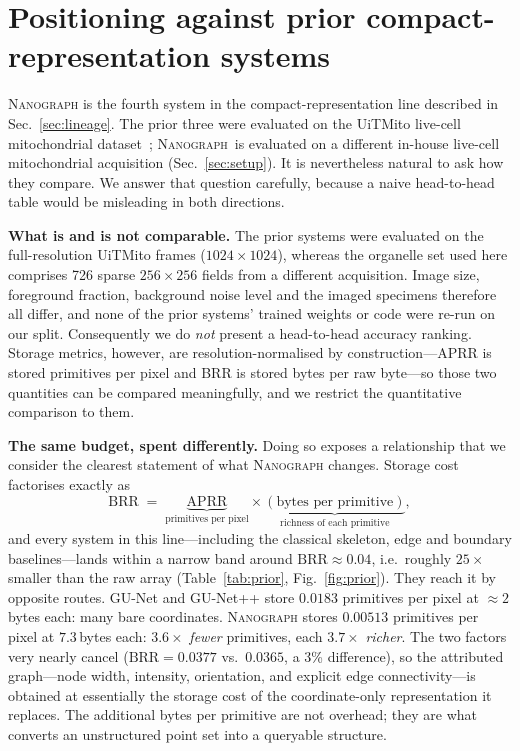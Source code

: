 \documentclass[10pt,a4paper]{article}
\newcommand{\method}{\textnormal{\textsc{Nanograph}}\xspace}
\begin{document}
\section{Positioning against prior compact-representation systems}
\label{sec:prior-comparison}
\method is the fourth system in the compact-representation line described in
Sec.~\ref{sec:lineage}. The prior three were evaluated on the UiTMito
live-cell mitochondrial dataset~\cite{sekh2021}; \method\ is evaluated on a
different in-house live-cell mitochondrial acquisition
(Sec.~\ref{sec:setup}). It is nevertheless
natural to ask how they compare. We answer that question carefully, because a
naive head-to-head table would be misleading in both directions.

\noindent\textbf{What is and is not comparable.} The prior systems were
evaluated on the full-resolution UiTMito frames ($1024\times1024$), whereas
the organelle set used here comprises 726 sparse $256\times256$ fields from
a different acquisition. Image size, foreground fraction, background
noise level and the imaged specimens therefore all differ, and none of the
prior systems' trained
weights or code were re-run on our split. Consequently we do \emph{not}
present a head-to-head accuracy ranking. Storage metrics, however, are
resolution-normalised by construction---APRR is stored primitives per pixel
and BRR is stored bytes per raw byte---so those two quantities can be
compared meaningfully, and we restrict the quantitative comparison to them.

\noindent\textbf{The same budget, spent differently.} Doing so exposes a
relationship that we consider the clearest statement of what \method changes.
Storage cost factorises exactly as
\begin{equation}
\mathrm{BRR} \;=\; \underbrace{\mathrm{APRR}}_{\text{primitives per pixel}}
\times \underbrace{(\text{bytes per primitive})}_{\text{richness of each primitive}} ,
\label{eq:budget}
\end{equation}
and every system in this line---including the classical skeleton, edge and
boundary baselines---lands within a narrow band around
$\mathrm{BRR}\approx0.04$, i.e.\ roughly $25\times$ smaller than the raw
array (Table~\ref{tab:prior}, Fig.~\ref{fig:prior}). They reach it by
opposite routes. GU-Net and GU-Net++ store $0.0183$ primitives per pixel at
$\approx2$\,bytes each: many bare coordinates. \method stores $0.00513$
primitives per pixel at $7.3$\,bytes each: $3.6\times$ \emph{fewer}
primitives, each $3.7\times$ \emph{richer}. The two factors very nearly
cancel ($\mathrm{BRR}=0.0377$ vs.\ $0.0365$, a 3\% difference), so the
attributed graph---node width, intensity, orientation, and explicit edge
connectivity---is obtained at essentially the storage cost of the
coordinate-only representation it replaces. The additional bytes per
primitive are not overhead; they are what converts an unstructured point set
into a queryable structure.
\end{document}
